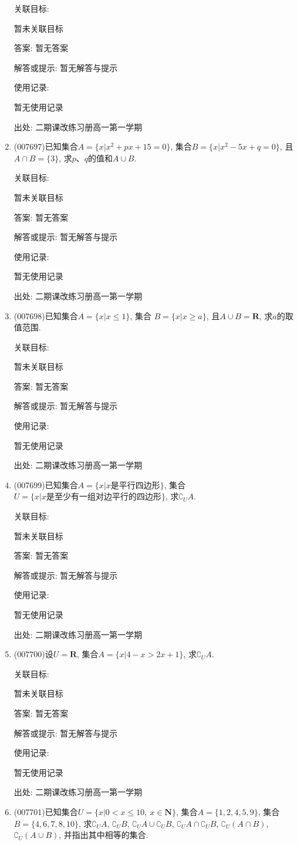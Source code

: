 \documentclass[10pt,a4paper]{article}
\begin{document}
\begin{enumerate}[1.]
关联目标:

暂未关联目标

答案: 暂无答案

解答或提示: 暂无解答与提示

使用记录:

暂无使用记录


出处: 二期课改练习册高一第一学期
\item { (007697)}已知集合$A=\{x|x^2+px+15=0\}$, 集合$B=\{x|x^2-5x+q=0\}$, 且$A\cap B=\{3\}$, 求$p$、$q$的值和$A\cup B$.


关联目标:

暂未关联目标

答案: 暂无答案

解答或提示: 暂无解答与提示

使用记录:

暂无使用记录


出处: 二期课改练习册高一第一学期
\item { (007698)}已知集合$A=\{x|x\le 1\}$, 集合 $B=\{x|x\ge a\}$, 且$A\cup B=\mathbf{R}$, 求$a$的取值范围.


关联目标:

暂未关联目标

答案: 暂无答案

解答或提示: 暂无解答与提示

使用记录:

暂无使用记录


出处: 二期课改练习册高一第一学期
\item { (007699)}已知集合$A=\{x|x\text{是平行四边形}\}$, 集合$U=\{x|x\text{是至少有一组对边平行的四边形}\}$, 求$\complement _UA$.


关联目标:

暂未关联目标

答案: 暂无答案

解答或提示: 暂无解答与提示

使用记录:

暂无使用记录


出处: 二期课改练习册高一第一学期
\item { (007700)}设$U=\mathbf{R}$, 集合$A=\{x|4-x>2x+1\}$, 求$\complement _UA$.


关联目标:

暂未关联目标

答案: 暂无答案

解答或提示: 暂无解答与提示

使用记录:

暂无使用记录


出处: 二期课改练习册高一第一学期
\item { (007701)}已知集合$U=\{x|0<x\le 10, \ x\in \mathbf{N}\}$, 集合$A=\{1,2,4,5,9\}$, 集合$B=\{4,6,7,8,10\}$, 求$\complement _UA$, $\complement _UB$, $\complement _UA\cup \complement _UB$, $\complement _UA\cap \complement _UB$, $\complement _U(A\cap B)$, $\complement _U(A\cup B)$, 并指出其中相等的集合.



\end{enumerate}
\end{document}
